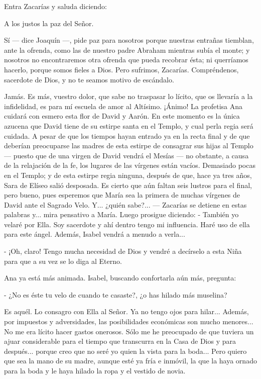 \documentclass[12pt, twoside, openright]{book} %
\begin{document}
Entra Zacarías y saluda diciendo: 

A los justos la paz del Señor. 

Sí — dice Joaquín —, pide paz para nosotros porque nuestras entrañas tiemblan, ante la ofrenda, como las de nuestro padre Abraham mientras subía el monte; y nosotros no encontraremos otra ofrenda que pueda recobrar ésta; ni querríamos hacerlo, porque somos fieles a Dios. Pero sufrimos, Zacarías. Compréndenos, sacerdote de Dios, y no te seamos motivo de escándalo. 

Jamás. Es más, vuestro dolor, que sabe no traspasar lo lícito, que os llevaría a la infidelidad, es para mí escuela de amor al Altísimo. ¡Ánimo! La profetisa Ana cuidará con esmero esta flor de David y Aarón. En este momento es la única azucena que David tiene de su estirpe santa en el Templo, y cual perla regia será cuidada. A pesar de que los tiempos hayan entrado ya en la recta final y de que deberían preocuparse las madres de esta estirpe de consagrar sus hijas al Templo — puesto que de una virgen de David vendrá el Mesías — no obstante, a causa de la relajación de la fe, los lugares de las vírgenes están vacíos. Demasiado pocas en el Templo; y de esta estirpe regia ninguna, después de que, hace ya tres años, Sara de Elíseo salió desposada. Es cierto que aún faltan seis lustros para el final, pero bueno, pues esperemos que María sea la primera de muchas vírgenes de David ante el Sagrado Velo. Y... ¿quién sabe?... — Zacarías se detiene en estas palabras y... mira pensativo a María. Luego prosigue diciendo: - También yo velaré por Ella. Soy sacerdote y ahí dentro tengo mi influencia. Haré uso de ella para este ángel. Además, Isabel vendrá a menudo a verla... 

- ¡Oh, claro! Tengo mucha necesidad de Dios y vendré a decírselo a esta Niña para que a su vez se lo diga al Eterno. 

Ana ya está más animada. Isabel, buscando confortarla aún más, pregunta: 

- ¿No es éste tu velo de cuando te casaste?, ¿o has hilado más muselina? 

Es aquél. Lo consagro con Ella al Señor. Ya no tengo ojos para hilar... Además, por impuestos y adversidades, las posibilidades económicas son mucho menores... No me era lícito hacer gastos onerosos. Sólo me he preocupado de que tuviera un ajuar considerable para el tiempo que transcurra en la Casa de Dios y para después... porque creo que no seré yo quien la vista para la boda... Pero quiero que sea la mano de su madre, aunque esté ya fría e inmóvil, la que la haya ornado para la boda y le haya hilado la ropa y el vestido de novia. 
\end{document}
